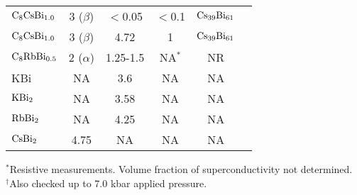{\begin{table}
\begin{center}
\begin{tabular}{|lc|cccc|}
$\rm C_8CsBi_{1.0}$ & 3 ($\beta$) & $<$0.05 & $<$0.1 & $\rm Cs_{39}Bi_{61}$ & \cite{stang88}\\ 
$\rm C_8CsBi_{1.0}$ & 3 ($\beta$) & 4.72 & 1 & $\rm Cs_{39}Bi_{61}$ & \cite{stang88}\\ 
$\rm C_8RbBi_{0.5}$ & 2 ($\alpha$) & 1.25-1.5 & NA$^*$ & NR & \cite{mcrae85}\\ 
KBi & NA &  3.6 & NA & NA & \cite{bendriss86}\\ 
$\rm KBi_2$ & NA & 3.58 & NA & NA & \cite{mcrae85}\\ 
$\rm RbBi_2$ & NA & 4.25 & NA & NA & \cite{mcrae85}\\ 
$\rm CsBi_2$ & 4.75 & NA & NA & NA &\cite{mcrae85}\\ 
\hline
\end{tabular}
\end{center}
$^*$Resistive measurements.  Volume fraction of superconductivity not determined.\\ 
$^{\dagger}$Also checked up to 7.0 kbar applied pressure.\\ 
\end{table}
}

{\newpage
\clearpage
\samepage \begin{figure}\vspace{15cm}

\label{inclusion}
\end{figure}
}

{\newpage
\clearpage
\samepage \begin{figure}%















































\vspace{15cm}

\label{csbi:alloytc}
\end{figure}
}


